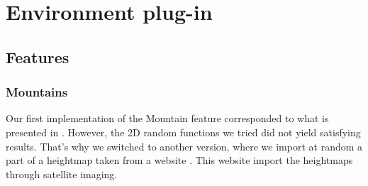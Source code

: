 \section{Environment plug-in}

\subsection{Features}

\subsubsection{Mountains}

Our first implementation of the Mountain feature corresponded to what is presented in \cite{FeatureTree}. However, the 2D random functions we tried did not yield satisfying results. That's why we switched to another version, where we import at random a part of a heightmap taken from a website \cite{terrain-party}. This website import the heightmaps through satellite imaging.